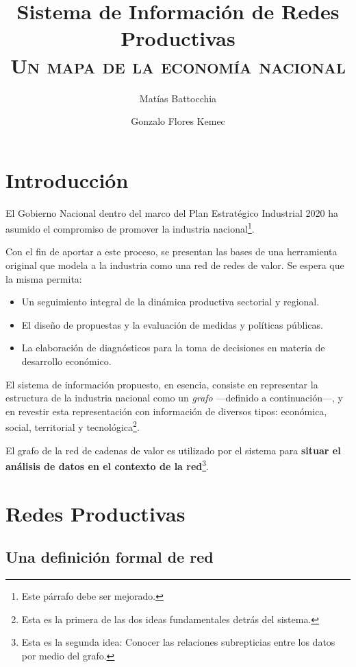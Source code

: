 \documentclass[a4paper]{report}
\begin{document}
\title{Sistema de Información de Redes Productivas\\\textsc{Un mapa de la economía nacional}}
\author{Matías Battocchia \and Gonzalo Flores Kemec}

\maketitle

\section*{Introducción}

El Gobierno Nacional dentro del marco del Plan Estratégico Industrial 2020 ha asumido el compromiso de promover la industria nacional\footnote{Este párrafo debe ser mejorado.}.

Con el fin de aportar a este proceso, se presentan las bases de una herramienta original que modela a la industria como una red de redes de valor. Se espera que la misma permita:

\begin{itemize}
  \item Un seguimiento integral de la dinámica productiva sectorial y regional.
  \item El diseño de propuestas y la evaluación de medidas y políticas públicas.
  \item La elaboración de diagnósticos para la toma de decisiones en materia de desarrollo económico.
\end{itemize}

El sistema de información propuesto, en esencia, consiste en representar la estructura de la industria nacional como un \textit{grafo} —definido a continuación—, y en revestir esta representación con información de diversos tipos: económica, social, territorial y tecnológica\footnote{Esta es la primera de las dos ideas fundamentales detrás del sistema.}.

El grafo de la red de cadenas de valor es utilizado por el sistema para \textbf{situar el análisis de datos en el contexto de la red}\footnote{Esta es la segunda idea: Conocer las relaciones subrepticias entre los datos por medio del grafo.}.

\section*{Redes Productivas}

\subsection*{Una definición formal de red}
\end{document}
